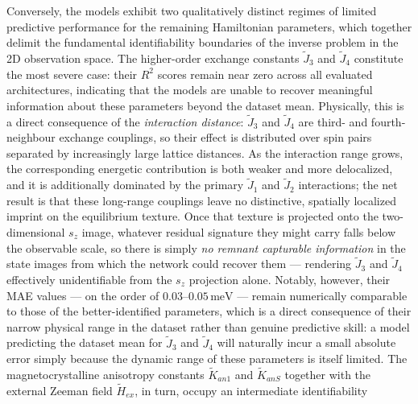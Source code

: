 \documentclass[letterpaper, 12, one column]{article}
\begin{document}
Conversely, the models exhibit two qualitatively distinct regimes of
limited predictive performance for the remaining Hamiltonian
parameters, which together delimit the fundamental identifiability
boundaries of the inverse problem in the 2D observation space. The
higher-order exchange constants $\tilde{J}_3$ and $\tilde{J}_4$
constitute the most severe case: their $R^2$ scores remain near zero
across all evaluated architectures, indicating that the models are
unable to recover meaningful information about these parameters
beyond the dataset mean. {\color[rgb]{0,0,1}Physically, this is a direct consequence of
the \emph{interaction distance}: $\tilde{J}_3$ and $\tilde{J}_4$ are
third- and fourth-neighbour exchange couplings, so their effect is
distributed over spin pairs separated by increasingly large lattice
distances. As the interaction range grows, the corresponding energetic
contribution is both weaker and more delocalized, and it is
additionally dominated by the primary $\tilde{J}_1$ and $\tilde{J}_2$
interactions; the net result is that these long-range couplings leave
no distinctive, spatially localized imprint on the equilibrium texture.
Once that texture is projected onto the two-dimensional $s_z$ image,
whatever residual signature they might carry falls below the
observable scale, so there is simply \emph{no remnant capturable
information} in the state images from which the network could recover
them --- rendering $\tilde{J}_3$ and $\tilde{J}_4$ effectively
unidentifiable from the $s_z$ projection alone.} Notably, however, their MAE values --- on the order of
$0.03$--$0.05\,\mathrm{meV}$ --- remain numerically comparable to
those of the better-identified parameters, which is a direct
consequence of their narrow physical range in the dataset rather than
genuine predictive skill: a model predicting the dataset mean for
$\tilde{J}_3$ and $\tilde{J}_4$ will naturally incur a small absolute
error simply because the dynamic range of these parameters is itself
limited. The magnetocrystalline anisotropy constants $\tilde{K}_{an1}$
and $\tilde{K}_{anS}$ together with the external Zeeman field
$\tilde{H}_{ex}$, in turn, occupy an intermediate identifiability
\end{document}
